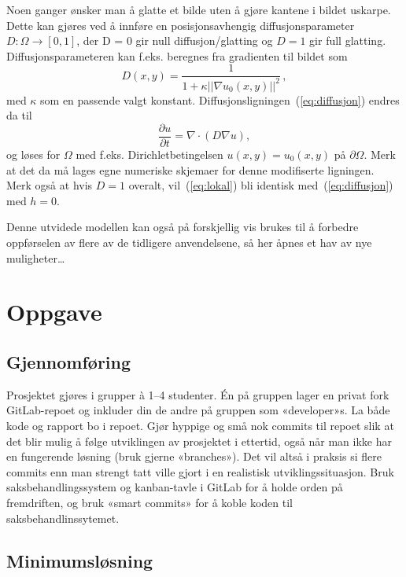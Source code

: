 \documentclass[11pt,a4paper]{article}
\begin{document}
Noen ganger ønsker man å glatte et bilde uten å gjøre kantene i bildet uskarpe. Dette kan gjøres ved å innføre en posisjonsavhengig diffusjonsparameter $D : \Omega \to [0, 1]$, der D = 0 gir null diffusjon/glatting og $D = 1$ gir full glatting. Diffusjonsparameteren kan f.eks. beregnes fra gradienten til bildet som
\begin{equation}
  D(x, y) = \frac{1}{1 + \kappa ||\nabla u_0(x, y)||^2}\,,
\end{equation}
med $\kappa$ som en passende valgt konstant.
Diffusjonsligningen~(\ref{eq:diffusjon}) endres da til
\begin{equation}
  \label{eq:lokal}
  \frac{\partial u}{\partial t} = \nabla\cdot(D\nabla u),
\end{equation}
og løses for $\Omega$ med f.eks. Dirichletbetingelsen $u(x, y) = u_0(x, y)$ på $\partial\Omega$. Merk at det da må lages egne numeriske skjemaer for denne modifiserte ligningen. Merk også at hvis $D=1$ overalt, vil~(\ref{eq:lokal}) bli identisk med~(\ref{eq:diffusjon}) med $h=0$.

Denne utvidede modellen kan også på forskjellig vis brukes til å forbedre oppførselen av flere av de tidligere anvendelsene, så her åpnes et hav av nye muligheter\dots

\section{Oppgave}

\subsection{Gjennomføring}

Prosjektet gjøres i grupper à 1–4 studenter. Én på gruppen lager en privat fork GitLab-repoet og inkluder din de andre på gruppen som «developer»s. La både kode og rapport bo i repoet. Gjør hyppige og små nok commits til repoet slik at det blir mulig å følge utviklingen av prosjektet i ettertid, også når man ikke har en fungerende løsning (bruk gjerne «branches»). Det vil altså i praksis si flere commits enn man strengt tatt ville gjort i en realistisk utviklingssituasjon. Bruk saksbehandlingssystem og kanban-tavle i GitLab for å holde orden på fremdriften, og bruk «smart commits» for å koble koden til saksbehandlinssytemet.

\subsection{Minimumsløsning}
\end{document}
